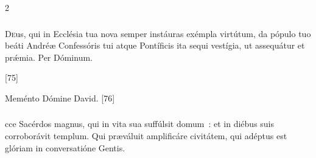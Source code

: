 \documentclass[9pt,twoside]{extarticle}
\begin{document}
\begin{multicols}{2}
{\subsubsection*{\center {}}
\lettrine{D}eus, qui in Ecclésia tua nova semper instáuras exémpla virtútum, da pópulo tuo beáti Andréæ Confessóris tui atque Pontíficis ita sequi vestígia, ut assequátur et prǽmia. Per Dóminum.

\begin{tightlist}{}
\item {} [75]
\item {} Meménto Dómine David. [76]
\end{tightlist}

\subsubsection*{}
cce Sacérdos magnus, qui in vita sua suffúlsit domum~: et in diébus suis corroborávit templum. Qui præváluit amplificáre civitátem, qui adéptus est glóriam in conversatióne Gentis.

}
\end{multicols}
\end{document}
